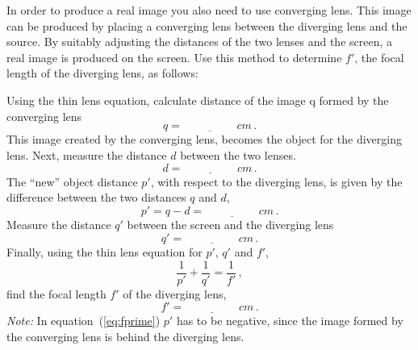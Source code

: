 \documentclass[11pt, a4paper]{article}
\begin{document}
In order to produce a real image you also need to use converging lens.
This image can be produced by placing a converging lens between the diverging
lens and the source.
By suitably adjusting the distances of the two lenses and the screen, a real
image is produced on the screen.
Use this method to determine $f'$, the focal length of the diverging lens, as follows:

Using the thin lens equation, calculate distance of the image q formed by the converging lens
\begin{equation*}
    q = \underline{\hspace{2cm}} \si{cm}\,.
\end{equation*}
This image created by the converging lens, becomes the object for the diverging lens. 
Next, measure the distance $d$ between the two lenses.
\begin{equation*}
    d = \underline{\hspace{2cm}} \si{cm}\,.
\end{equation*}
The ``new'' object distance $p'$, with respect to the diverging lens, is given by the
difference between the two distances $q$ and $d$,
\begin{equation*}
    p' = q - d  = \underline{\hspace{2cm}} \si{cm}\,.
\end{equation*}
Measure the distance $q'$ between the screen and the diverging lens
\begin{equation*}
     q'  = \underline{\hspace{2cm}} \si{cm}\,.
\end{equation*}
Finally, using the thin lens equation for $p'$, $q'$ and $f'$,
\begin{equation}
    \frac{1}{p'} + \frac{1}{q'} = \frac{1}{f'}\,,
\end{equation}
find the focal length $f'$ of the diverging lens,
\begin{equation*}
     f'  = \underline{\hspace{2cm}} \si{cm}\,.
     \label{eq:fprime}
\end{equation*}
\textit{Note:} In equation~(\ref{eq:fprime}) $p'$ has to be negative, since the image formed by
the converging lens is behind the diverging lens.
\end{document}
